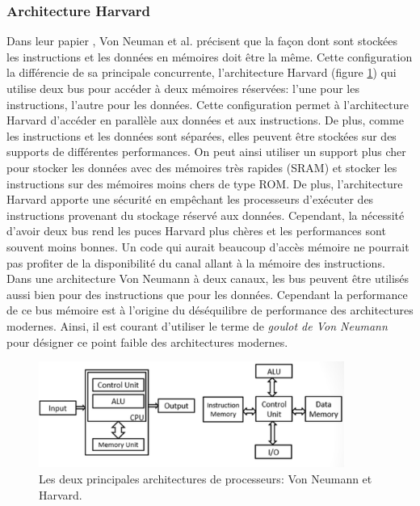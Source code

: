     \subsubsection{Architecture Harvard}\label{sec:harvard}

        Dans leur papier \cite{238389}, Von Neuman et al. précisent que la façon dont sont stockées les instructions et les données en mémoires doit être la même. Cette configuration la différencie de sa principale concurrente, l'architecture  Harvard (figure \ref{pic_neumannHarvard}) qui utilise deux bus pour accéder à deux mémoires réservées: l'une pour les instructions, l'autre pour les données. 
        Cette configuration permet à l'architecture Harvard d'accéder en parallèle aux données et aux instructions. De plus, comme les instructions et les données sont séparées, elles peuvent être stockées sur des supports de différentes performances. On peut ainsi utiliser un support plus cher pour stocker les données avec des mémoires très rapides (SRAM) et stocker les instructions sur des mémoires moins chers de type ROM. De plus, l'architecture Harvard apporte une sécurité en empêchant les processeurs d'exécuter des instructions provenant du stockage réservé aux données. Cependant, la nécessité d'avoir deux bus rend les puces Harvard plus chères et les performances sont souvent moins bonnes. Un code qui aurait beaucoup d'accès mémoire ne pourrait pas profiter de la disponibilité du canal allant à la mémoire des instructions. Dans une architecture Von Neumann à deux canaux, les bus peuvent être utilisés aussi bien pour des instructions que pour les données. Cependant la performance de ce bus mémoire est à l'origine du déséquilibre de performance des architectures modernes. Ainsi, il est courant d'utiliser le terme de \textit{goulot de Von Neumann} pour désigner ce point faible des architectures modernes.
        
        \begin{figure}
            \center
            \includegraphics[width=10cm]{images/Chapitre1/neumannHarvard.png}
            \caption{\label{pic_neumannHarvard} Les deux principales architectures de processeurs: Von Neumann et Harvard. }
        \end{figure}


